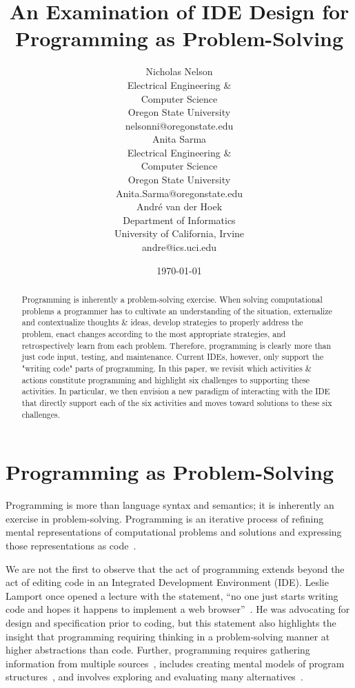 \documentclass{ppig}
\title{An Examination of IDE Design for Programming as Problem-Solving}
\author{Nicholas Nelson \\
  Electrical Engineering \&\\ Computer Science \\
  Oregon State University \\
  nelsonni@oregonstate.edu \\
  \And
  Anita Sarma \\
  Electrical Engineering \&\\ Computer Science \\
  Oregon State University \\
  Anita.Sarma@oregonstate.edu \\
  \And
  André van der Hoek \\
  Department of Informatics \\
  University of California, Irvine \\
  andre@ics.uci.edu
}
\date{\today}
\begin{document}
\maketitle
\thispagestyle{empty}

\begin{abstract}

Programming is inherently a problem-solving exercise.
When solving computational problems a programmer has to cultivate an understanding of the situation, externalize and contextualize thoughts \& ideas, develop strategies to properly address the problem, enact changes according to the most appropriate strategies, and retrospectively learn from each problem.
Therefore, programming is clearly more than just code input, testing, and maintenance.
Current IDEs, however, only support the "writing code" parts of programming.
In this paper, we revisit which activities \& actions constitute programming and highlight six challenges to supporting these activities.
In particular, we then envision a new paradigm of interacting with the IDE that directly support each of the six activities and moves toward solutions to these six challenges. 
\end{abstract}

\section{Programming as Problem-Solving}

Programming is more than language syntax and semantics; it is inherently an exercise in problem-solving.
Programming is an iterative process of refining mental representations of computational problems and solutions and expressing those representations as code~\cite{loksa2016programming}.

We are not the first to observe that the act of programming extends beyond the act of editing code in an Integrated Development Environment (IDE).
Leslie Lamport once opened a lecture with the statement, ``no one just starts writing code and hopes it happens to implement a web browser''~\cite{lamport2015lecture}.
He was advocating for design and specification prior to coding, but this statement also highlights the insight that programming requiring thinking in a problem-solving manner at higher abstractions than code.
Further, programming requires gathering information from multiple sources~\cite{sillito2008asking}, includes creating mental models of program structures~\cite{von1995comprehension}, and involves exploring and evaluating many alternatives~\cite{hartmann2008design}.
\end{document}
